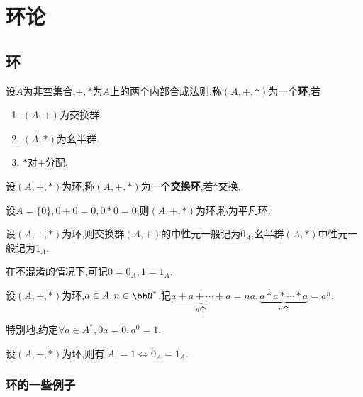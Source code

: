 \chapter{环论}

\section{环}

\begin{deff}
    设$A$为非空集合,$+, *$为$A$上的两个内部合成法则.称$(A, +, *)$为一个\textbf{环},若
    \begin{enumerate}
        \item $(A, +)$为交换群.
        \item $(A, *)$为幺半群.
        \item $*$对$+$分配.
    \end{enumerate}
\end{deff}

\begin{deff}
    设$(A, + ,*)$为环,称$(A, +, *)$为一个\textbf{交换环},若$*$交换.
\end{deff}

\begin{rqq}
    设$A = \{ 0 \}, 0 + 0 = 0, 0 * 0 = 0$,则$(A, +, *)$为环,称为平凡环.
\end{rqq}

\begin{rqq}
    设$(A, +, *)$为环,则交换群$(A, +)$的中性元一般记为$0_A$,幺半群$(A, *)$中性元一般记为$1_A$.
\end{rqq}

\begin{rqq}
    在不混淆的情况下,可记$0 = 0_A, 1 = 1_A$.
\end{rqq}

\begin{rqq}
    设$(A, +, *)$为环,$a \in A, n \in \bbN^*$.记$\underbrace{a + a + \cdots + a}_{n \text{个}} = na, \underbrace{a * a * \cdots * a}_{n \text{个}} = a^n$.

    特别地,约定$\forall a \in A^*, 0a = 0, a^0 = 1$.
\end{rqq}

\begin{exer}
    设$(A, +, *)$为环,则有$\lvert A \rvert = 1 \iff 0_A = 1_A$.
\end{exer}

\subsection*{环的一些例子}


